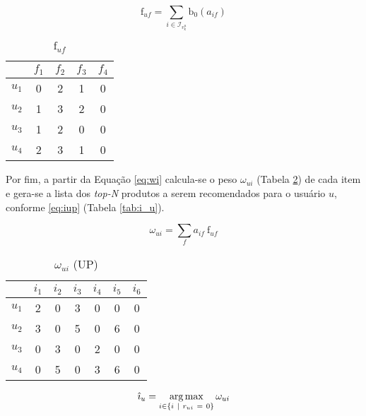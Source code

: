 \begin{equation}
\label{eq:frf} 
\mathrm{f}_{uf} = \sum_{i \in \mathcal{I}_{v_k^u}}{\mathrm{b}_0\left(a_{if}\right)}
\end{equation} 

\begin{table}[p]
\begin{center}
    \caption{$\mathrm{f}_{uf}$}
    \label{tab:f_uf}
    \begin{tabular}{ | c | c | c | c | c | } 
    \hline
     & $f_1$ & $f_2$ & $f_3$ & $f_4$   \\ \hline
     $u_1$ & 0 & 2 & 1 & 0  \\ \hline
     $u_2$ & 1 & 3 & 2 & 0  \\ \hline
     $u_3$ & 1 & 2 & 0 & 0  \\ \hline
     $u_4$ & 2 & 3 & 1 & 0  \\ \hline
    \end{tabular}
\end{center}
\end{table}

Por fim, a partir da Equação \ref{eq:wi} calcula-se o peso $\omega_{ui}$ (Tabela \ref{tab:omega_ui}) de cada item e gera-se a lista dos \textit{top-N} produtos a serem recomendados para o usuário $u$, conforme \ref{eq:iup} (Tabela \ref{tab:i_u}). 

\begin{equation}
\label{eq:wi} 
    \omega_{ui} = \sum_{f}{a_{if}~\mathrm{f}_{uf}}
\end{equation} 


\begin{table}[p]
\begin{center}
    \caption{$\omega_{ui}$ (UP)}
    \label{tab:omega_ui}
    \begin{tabular}{ | c | c | c | c | c | c | c | } 
    \hline
     & $i_1$ & $i_2$ & $i_3$ & $i_4$ & $i_5$ & $i_6$ \\ \hline
     $u_1$ & 2 & 0 & 3 & 0 & 0 & 0 \\ \hline
     $u_2$ & 3 & 0 & 5 & 0 & 6 & 0 \\ \hline
     $u_3$ & 0 & 3 & 0 & 2 & 0 & 0 \\ \hline
     $u_4$ & 0 & 5 & 0 & 3 & 6 & 0 \\ \hline
    \end{tabular}
\end{center}
\end{table}

\begin{equation}
\label{eq:iup} 
    \hat{\imath}_u = \operatorname*{arg\,max}_{i \in \left\{i~|~r_{ui}~=~0\right\}}{\omega_{ui}}
\end{equation} 

